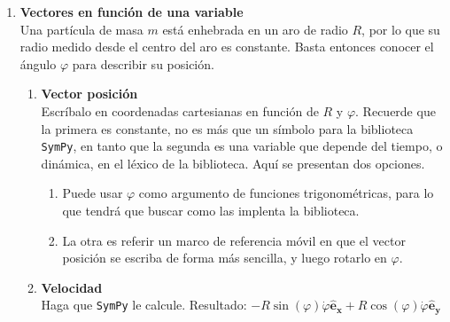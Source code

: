 \documentclass[11pt, a4paper, twoside]{article}
\begin{document}
\begin{enumerate}
	\item
		\begin{minipage}[t][8cm]{0.68\textwidth}
			\textbf{Vectores en función de una variable}\\
			Una partícula de masa \(m\) está enhebrada en un aro de radio $R$, por lo que su radio medido desde el centro del aro es constante.
			Basta entonces conocer el ángulo $\varphi$ para describir su posición.
			\begin{enumerate}
				\item \textbf{Vector posición}\\
				Escríbalo en coordenadas cartesianas en función de \(R\) y \(\varphi\).
				Recuerde que la primera es constante, no es más que un símbolo para la biblioteca \verb'SymPy', en tanto que la segunda es una variable que depende del tiempo, o dinámica, en el léxico de la biblioteca.
				Aquí se presentan dos opciones.
				\begin{enumerate}
					\item Puede usar \(\varphi\) como argumento de funciones trigonométricas, para lo que tendrá que buscar como las implenta la biblioteca.
					\item La otra es referir un marco de referencia móvil en que el vector posición se escriba de forma más sencilla, y luego rotarlo en \(\varphi\).
				\end{enumerate}
				\item \textbf{Velocidad}\\
				Haga que \verb'SymPy' le calcule. Resultado: 
				\(
					-  R \sin{\left(\varphi \right)} \dot{\varphi}\mathbf{\hat{e}_x} + R \cos{\left(\varphi \right)} \dot{\varphi}\mathbf{\hat{e}_y}
				\)
			\end{enumerate}
		\end{minipage}
		\begin{minipage}[c][-1.5cm][t]{0.15\textwidth}
			
		\end{minipage}



\end{enumerate}
\end{document}
